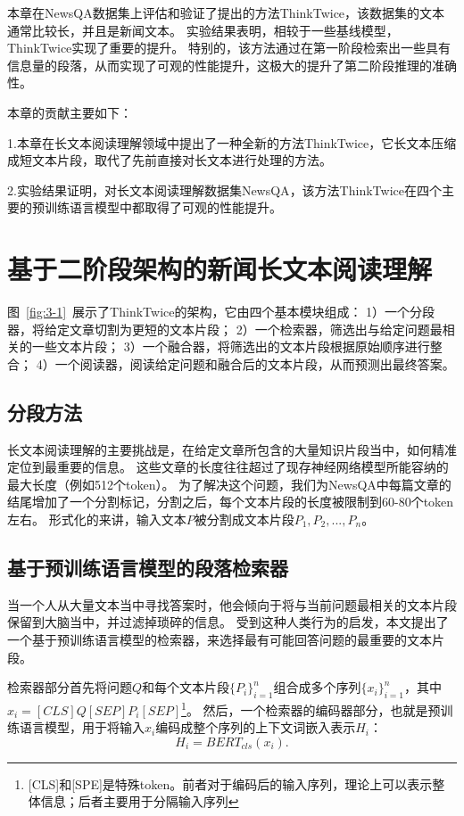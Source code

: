 本章在NewsQA数据集\cite{trischler2016newsqa}上评估和验证了提出的方法ThinkTwice，该数据集的文本通常比较长，并且是新闻文本。
实验结果表明，相较于一些基线模型\cite{devlin2018bert,joshi2020spanbert,tay2018densely}，ThinkTwice实现了重要的提升。
特别的，该方法通过在第一阶段检索出一些具有信息量的段落，从而实现了可观的性能提升，这极大的提升了第二阶段推理的准确性。

本章的贡献主要如下：

1.本章在长文本阅读理解领域中提出了一种全新的方法ThinkTwice，它长文本压缩成短文本片段，取代了先前直接对长文本进行处理的方法。

2.实验结果证明，对长文本阅读理解数据集NewsQA\cite{trischler2016newsqa}，该方法ThinkTwice在四个主要的预训练语言模型\cite{devlin2018bert,liu2019roberta,lan2019albert,joshi2020spanbert}中都取得了可观的性能提升。

\section{基于二阶段架构的新闻长文本阅读理解}
图~\ref{fig:3-1}~展示了ThinkTwice的架构，它由四个基本模块组成：
1）一个分段器，将给定文章切割为更短的文本片段；
2）一个检索器，筛选出与给定问题最相关的一些文本片段；
3）一个融合器，将筛选出的文本片段根据原始顺序进行整合；
4）一个阅读器，阅读给定问题和融合后的文本片段，从而预测出最终答案。




\subsection{分段方法}
长文本阅读理解的主要挑战是，在给定文章所包含的大量知识片段当中，如何精准定位到最重要的信息。
这些文章的长度往往超过了现存神经网络模型所能容纳的最大长度（例如512个token）。
为了解决这个问题，我们为NewsQA中每篇文章的结尾增加了一个分割标记，分割之后，每个文本片段的长度被限制到60-80个token左右。
形式化的来讲，输入文本$P$被分割成文本片段$P_1,P_2,...,P_n$。

\subsection{基于预训练语言模型的段落检索器}
当一个人从大量文本当中寻找答案时，他会倾向于将与当前问题最相关的文本片段保留到大脑当中，并过滤掉琐碎的信息。
受到这种人类行为的启发，本文提出了一个基于预训练语言模型的检索器，来选择最有可能回答问题的最重要的文本片段。

检索器部分首先将问题$Q$和每个文本片段$\{P_i\}^n_{i=1}$组合成多个序列$\{x_i\}^n_{i=1}$，其中$x_i=[CLS]Q[SEP]P_i[SEP]$\footnote{[CLS]和[SPE]是特殊token。前者对于编码后的输入序列，理论上可以表示整体信息；后者主要用于分隔输入序列}。
然后，一个检索器的编码器部分，也就是预训练语言模型，用于将输入$x_i$编码成整个序列的上下文词嵌入表示$H_i$：
\begin{equation}
    H_i = BERT_{cls}(x_i).
\end{equation}

